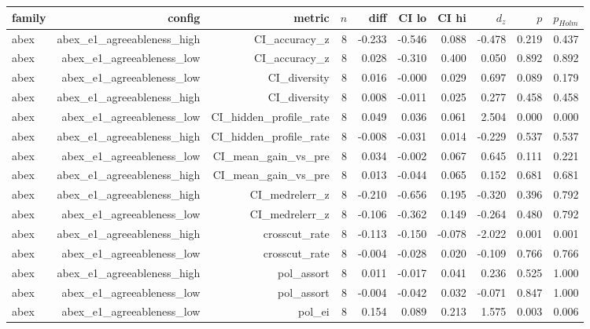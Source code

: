 \documentclass[11pt]{article}
\begin{document}
\begin{landscape}
\tiny
\setlength{\tabcolsep}{2.5pt}
\begin{longtable}{@{}lrrrrrrrrr@{}}
\toprule
family & config & metric & $n$ & diff & CI lo & CI hi & $d_z$ & $p$ & $p_{Holm}$ \\
\midrule
\endhead
abex & abex\_e1\_agreeableness\_high & CI\_accuracy\_z & 8 & -0.233 & -0.546 & 0.088 & -0.478 & 0.219 & 0.437 \\
abex & abex\_e1\_agreeableness\_low & CI\_accuracy\_z & 8 & 0.028 & -0.310 & 0.400 & 0.050 & 0.892 & 0.892 \\
abex & abex\_e1\_agreeableness\_low & CI\_diversity & 8 & 0.016 & -0.000 & 0.029 & 0.697 & 0.089 & 0.179 \\
abex & abex\_e1\_agreeableness\_high & CI\_diversity & 8 & 0.008 & -0.011 & 0.025 & 0.277 & 0.458 & 0.458 \\
abex & abex\_e1\_agreeableness\_low & CI\_hidden\_profile\_rate & 8 & 0.049 & 0.036 & 0.061 & 2.504 & 0.000 & 0.000 \\
abex & abex\_e1\_agreeableness\_high & CI\_hidden\_profile\_rate & 8 & -0.008 & -0.031 & 0.014 & -0.229 & 0.537 & 0.537 \\
abex & abex\_e1\_agreeableness\_low & CI\_mean\_gain\_vs\_pre & 8 & 0.034 & -0.002 & 0.067 & 0.645 & 0.111 & 0.221 \\
abex & abex\_e1\_agreeableness\_high & CI\_mean\_gain\_vs\_pre & 8 & 0.013 & -0.044 & 0.065 & 0.152 & 0.681 & 0.681 \\
abex & abex\_e1\_agreeableness\_high & CI\_medrelerr\_z & 8 & -0.210 & -0.656 & 0.195 & -0.320 & 0.396 & 0.792 \\
abex & abex\_e1\_agreeableness\_low & CI\_medrelerr\_z & 8 & -0.106 & -0.362 & 0.149 & -0.264 & 0.480 & 0.792 \\
abex & abex\_e1\_agreeableness\_high & crosscut\_rate & 8 & -0.113 & -0.150 & -0.078 & -2.022 & 0.001 & 0.001 \\
abex & abex\_e1\_agreeableness\_low & crosscut\_rate & 8 & -0.004 & -0.028 & 0.020 & -0.109 & 0.766 & 0.766 \\
abex & abex\_e1\_agreeableness\_high & pol\_assort & 8 & 0.011 & -0.017 & 0.041 & 0.236 & 0.525 & 1.000 \\
abex & abex\_e1\_agreeableness\_low & pol\_assort & 8 & -0.004 & -0.042 & 0.032 & -0.071 & 0.847 & 1.000 \\
abex & abex\_e1\_agreeableness\_low & pol\_ei & 8 & 0.154 & 0.089 & 0.213 & 1.575 & 0.003 & 0.006 \\

\end{longtable}
\end{landscape}
\end{document}
